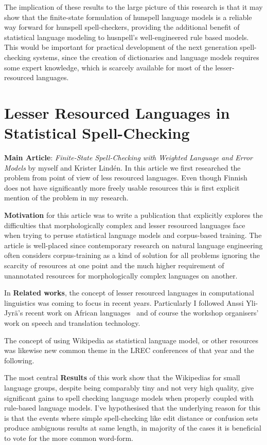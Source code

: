 \documentclass[officiallayout]{unihelcompling}
\begin{document}
The implication of these results to the large picture of this research is
that it may show that the finite-state formulation of hunspell language models
is a reliable way forward for hunspell spell-checkers, providing the additional
benefit of statistical language modeling to husnpell's well-engineered
rule based models. This would be important for practical development of
the next generation spell-checking systems, since the creation of dictionaries
and language models requires some expert knowledge, which is scarcely available
for most of the lesser-resourced languages.

\section{Lesser Resourced Languages in Statistical Spell-Checking}

\textbf{Main Article}: \emph{Finite-State Spell-Checking with Weighted Language
and Error Models} by myself and Krister Lindén. In this article we first
researched the problem from point of view of less resourced languages. Even
though Finnish does not have significantly more freely usable resources this
is first explicit mention of the problem in my research.

\textbf{Motivation} for this article was to write a publication that
explicitly explores the difficulties that morphologically complex and lesser
resourced languages face when trying to peruse statistical language models and
corpus-based training. The article is well-placed since contemporary research
on natural language engineering often considers corpus-training as a kind of
solution for all problems ignoring the scarcity of resources at one point and
the much higher requirement of unannotated resources for morphologically
complex languages on another.

In \textbf{Related works}, the concept of lesser resourced languages in
computational linguistics was coming to focus in recent years. Particularly I
followed Anssi Yli-Jyrä's recent work on African
languages~\citep{yli2005toward} and of course the workshop organisers' work on
speech and translation technology.

The concept of using Wikipedia as statistical language model, or other
resources was likewise new common theme in the LREC conferences of that
year and the following.

The most central \textbf{Results} of this work show that the Wikipedias for
small language groups, despite being comparably tiny and not very high quality,
give significant gains to spell checking language models when properly
coupled with rule-based language models. I've hypothesised that the underlying
reason for this is that the events where simple spell-checking like edit
distance or confusion sets produce ambiguous results at same length, in
majority of the cases it is beneficial to vote for the more common word-form.
\end{document}
